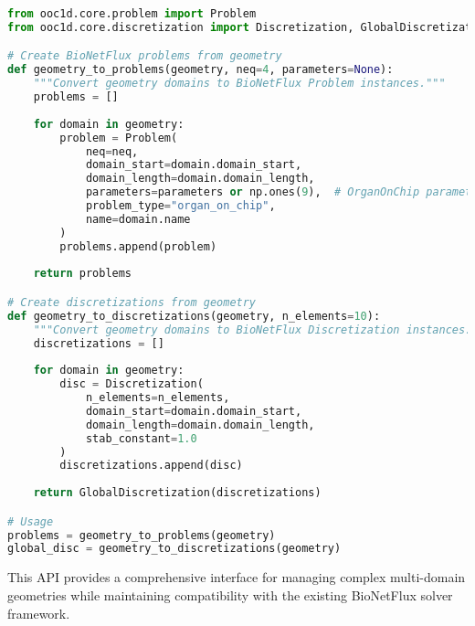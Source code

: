 \begin{lstlisting}[language=Python, caption=BioNetFlux Integration Example]
from ooc1d.core.problem import Problem
from ooc1d.core.discretization import Discretization, GlobalDiscretization

# Create BioNetFlux problems from geometry
def geometry_to_problems(geometry, neq=4, parameters=None):
    """Convert geometry domains to BioNetFlux Problem instances."""
    problems = []
    
    for domain in geometry:
        problem = Problem(
            neq=neq,
            domain_start=domain.domain_start,
            domain_length=domain.domain_length,
            parameters=parameters or np.ones(9),  # OrganOnChip parameters
            problem_type="organ_on_chip",
            name=domain.name
        )
        problems.append(problem)
    
    return problems

# Create discretizations from geometry
def geometry_to_discretizations(geometry, n_elements=10):
    """Convert geometry domains to BioNetFlux Discretization instances."""
    discretizations = []
    
    for domain in geometry:
        disc = Discretization(
            n_elements=n_elements,
            domain_start=domain.domain_start,
            domain_length=domain.domain_length,
            stab_constant=1.0
        )
        discretizations.append(disc)
    
    return GlobalDiscretization(discretizations)

# Usage
problems = geometry_to_problems(geometry)
global_disc = geometry_to_discretizations(geometry)
\end{lstlisting}

This API provides a comprehensive interface for managing complex multi-domain geometries while maintaining compatibility with the existing BioNetFlux solver framework.

